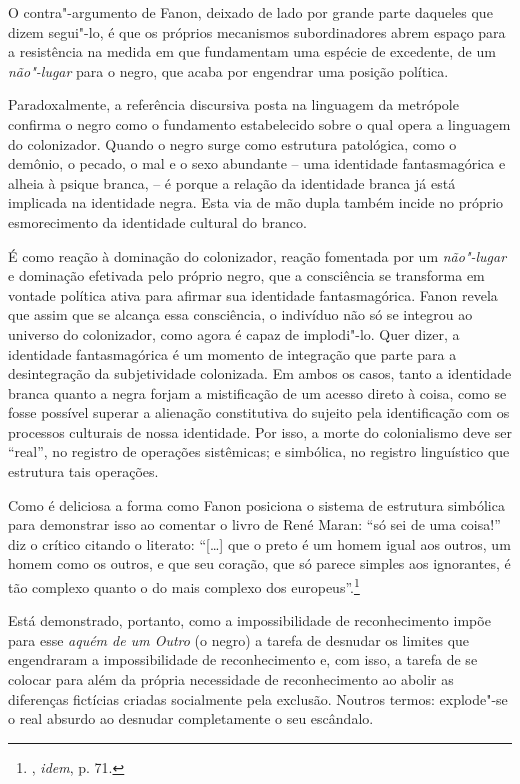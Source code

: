 O contra"-argumento de Fanon, deixado de lado por grande parte daqueles
que dizem segui"-lo, é que os próprios mecanismos subordinadores abrem
espaço para a resistência na medida em que fundamentam uma espécie de
excedente, de um \emph{não"-lugar} para o negro, que acaba por engendrar
uma posição política.

Paradoxalmente, a referência discursiva posta na linguagem da metrópole
confirma o negro como o fundamento estabelecido sobre o qual opera a
linguagem do colonizador. Quando
o negro surge como estrutura patológica, como o demônio, o pecado, o mal
e o sexo abundante -- uma identidade fantasmagórica e alheia à psique
branca, -- é porque a relação da identidade branca já está implicada na
identidade negra. Esta via de mão dupla também incide no próprio
esmorecimento da identidade cultural do branco.

É como reação à dominação do
colonizador, reação fomentada por um \emph{não"-lugar} e dominação
efetivada pelo próprio negro, que a consciência se transforma em vontade
política ativa para afirmar sua identidade fantasmagórica. Fanon revela
que assim que se alcança essa consciência, o indivíduo não só se
integrou ao universo do colonizador, como agora é capaz de implodi"-lo.
Quer dizer, a identidade fantasmagórica é um momento de integração que
parte para a desintegração da subjetividade colonizada. Em ambos os
casos, tanto a identidade branca quanto a negra forjam a mistificação de
um acesso direto à coisa, como se fosse possível superar a alienação
constitutiva do sujeito pela identificação com os processos culturais de
nossa identidade. Por isso, a morte do colonialismo deve ser ``real'', no
registro de operações sistêmicas; e simbólica, no registro linguístico
que estrutura tais operações.

Como é deliciosa a forma como Fanon posiciona o sistema de estrutura
simbólica para demonstrar isso ao comentar o livro de René Maran: ``só
sei de uma coisa!'' diz o crítico citando o literato: ``{[}\ldots{}{]} que o
preto é um homem igual aos outros, um homem como os outros, e que seu
coração, que só parece simples aos ignorantes, é tão complexo quanto o
do mais complexo dos europeus''.\footnote{, \emph{idem}, p. 71.}

Está demonstrado, portanto, como a impossibilidade de reconhecimento
impõe para esse \emph{aquém de um Outro} (o negro) a tarefa de desnudar
os limites que engendraram a impossibilidade de reconhecimento e, com
isso, a tarefa de se colocar para além da própria necessidade de
reconhecimento ao abolir as diferenças fictícias criadas socialmente
pela exclusão. Noutros termos: explode"-se o real absurdo ao desnudar
completamente o seu escândalo.

